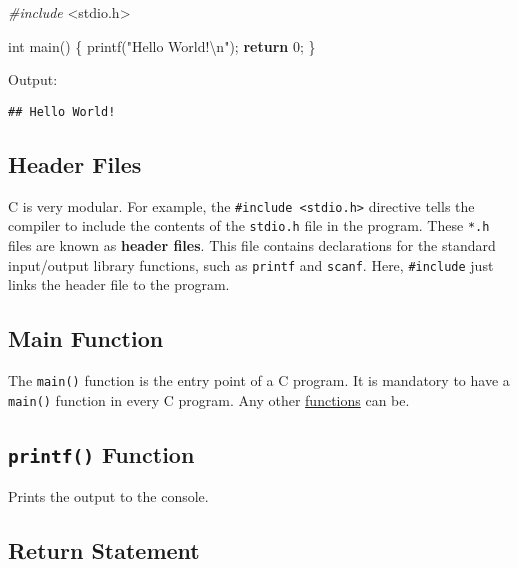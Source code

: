 \documentclass[
]{article}
\newenvironment{Shaded}{\begin{snugshade}}{\end{snugshade}}
\newcommand{\ControlFlowTok}[1]{\textcolor[rgb]{0.13,0.29,0.53}{\textbf{#1}}}
\newcommand{\DataTypeTok}[1]{\textcolor[rgb]{0.13,0.29,0.53}{#1}}
\newcommand{\DecValTok}[1]{\textcolor[rgb]{0.00,0.00,0.81}{#1}}
\newcommand{\ImportTok}[1]{#1}
\newcommand{\NormalTok}[1]{#1}
\newcommand{\PreprocessorTok}[1]{\textcolor[rgb]{0.56,0.35,0.01}{\textit{#1}}}
\newcommand{\SpecialCharTok}[1]{\textcolor[rgb]{0.00,0.00,0.00}{#1}}
\newcommand{\StringTok}[1]{\textcolor[rgb]{0.31,0.60,0.02}{#1}}
\begin{document}
\begin{Shaded}
\begin{Highlighting}[]
\PreprocessorTok{\#include }\ImportTok{\textless{}stdio.h\textgreater{}}

\DataTypeTok{int}\NormalTok{ main() \{}
\NormalTok{    printf(}\StringTok{"Hello World!}\SpecialCharTok{\textbackslash{}n}\StringTok{"}\NormalTok{);}
    \ControlFlowTok{return} \DecValTok{0}\NormalTok{;}
\NormalTok{\}}
\end{Highlighting}
\end{Shaded}

Output:

\begin{verbatim}
## Hello World!
\end{verbatim}

\hypertarget{header-files}{%
\subsection{Header Files}\label{header-files}}

C is very modular. For example, the
\texttt{\#include\ \textless{}stdio.h\textgreater{}} directive tells the
compiler to include the contents of the \texttt{stdio.h} file in the
program. These \texttt{*.h} files are known as \textbf{header files}.
This file contains declarations for the standard input/output library
functions, such as \texttt{printf} and \texttt{scanf}. Here,
\texttt{\#include} just links the header file to the program.

\hypertarget{main-function}{%
\subsection{Main Function}\label{main-function}}

The \texttt{main()} function is the entry point of a C program. It is
mandatory to have a \texttt{main()} function in every C program. Any
other \protect\hyperlink{functions}{functions} can be.

\hypertarget{printf-function}{%
\subsection{\texorpdfstring{\texttt{printf()}
Function}{printf() Function}}\label{printf-function}}

Prints the output to the console.

\hypertarget{return-statement}{%
\subsection{Return Statement}\label{return-statement}}
\end{document}
